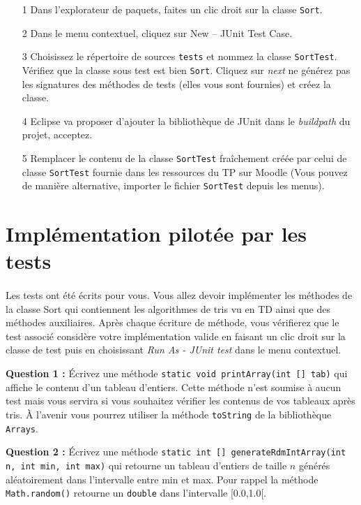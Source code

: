 \documentclass[iutinfo, a4paper, nocorrection, 10pt]{ustl-tdtp}
\begin{document}
\begin{itemize}
\item[1] Dans l'explorateur de paquets, faites un clic droit sur la classe \texttt{Sort}.
\item[2] Dans le menu contextuel, cliquez sur New – JUnit Test Case.
\item[3] Choisissez le répertoire de sources \texttt{tests} et nommez la classe \texttt{SortTest}. Vérifiez que la classe sous test est bien \texttt{Sort}. Cliquez sur \textit{next} ne générez pas les signatures des méthodes de tests (elles vous sont fournies) et créez la classe.
\item[4] Eclipse va proposer d'ajouter la bibliothèque de JUnit dans le \textit{buildpath} du projet, acceptez.
\item[5] Remplacer le contenu de la classe \texttt{SortTest} fraîchement créée par celui de classe \texttt{SortTest} fournie dans les ressources du TP sur Moodle (Vous pouvez de manière alternative, importer le fichier \texttt{SortTest} depuis les menus).
\end{itemize}


\section{Implémentation pilotée par les tests}
\paragraph{}
Les tests ont été écrits pour vous. Vous allez devoir implémenter les méthodes de la classe Sort qui contiennent les algorithmes de tris vu en TD ainsi que des méthodes auxiliaires. Après chaque écriture de méthode, vous vérifierez que le test associé considère votre implémentation valide en faisant un clic droit sur la classe de test puis en choisissant  \textit{Run As - JUnit test} dans le menu contextuel. \newline



\textbf{Question 1 : }\newline
Écrivez une méthode \texttt{static void printArray(int [] tab)} qui affiche le contenu d'un tableau d'entiers. Cette méthode n'est soumise à aucun test mais vous servira si vous souhaitez vérifier les contenus de vos tableaux après tris. À l'avenir vous pourrez utiliser la méthode \texttt{toString} de la bibliothèque \texttt{Arrays}. \newline


\textbf{Question 2 : }\newline
Écrivez une méthode \texttt{static int [] generateRdmIntArray(int n, int min, int max)} qui retourne un tableau d'entiers de taille $n$ générés aléatoirement dans l'intervalle entre min et max. Pour rappel la méthode \texttt{Math.random()} retourne un \texttt{double} dans l'intervalle [0.0,1.0[.
\newline
\end{document}
